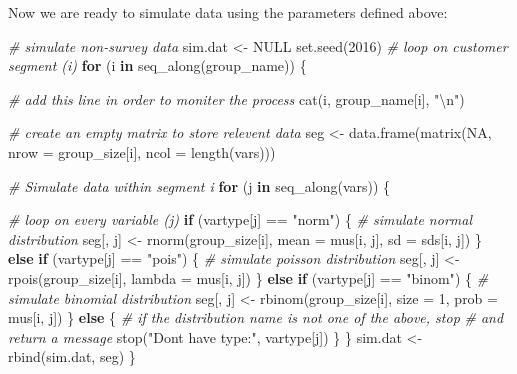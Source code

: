 \documentclass[
  12pt,
]{krantz}
\makeatletter
\newenvironment{Shaded}{\begin{snugshade}}{\end{snugshade}}
\newcommand{\AttributeTok}[1]{\textcolor[rgb]{0.61,0.61,0.61}{#1}}
\newcommand{\CommentTok}[1]{\textcolor[rgb]{0.37,0.37,0.37}{\textit{#1}}}
\newcommand{\ConstantTok}[1]{\textcolor[rgb]{0,0,0}{#1}}
\newcommand{\ControlFlowTok}[1]{\textcolor[rgb]{0.27,0.27,0.27}{\textbf{#1}}}
\newcommand{\DecValTok}[1]{\textcolor[rgb]{0.06,0.06,0.06}{#1}}
\newcommand{\FunctionTok}[1]{\textcolor[rgb]{0,0,0}{#1}}
\newcommand{\NormalTok}[1]{#1}
\newcommand{\OtherTok}[1]{\textcolor[rgb]{0.37,0.37,0.37}{#1}}
\newcommand{\SpecialCharTok}[1]{\textcolor[rgb]{0,0,0}{#1}}
\newcommand{\StringTok}[1]{\textcolor[rgb]{0.5,0.5,0.5}{#1}}
\newenvironment{kframe}{%
\medskip{}
\setlength{\fboxsep}{.8em}
 \def\at@end@of@kframe{}%
 \ifinner\ifhmode%
  \def\at@end@of@kframe{\end{minipage}}%
  \begin{minipage}{\columnwidth}%
 \fi\fi%
 \def\FrameCommand##1{\hskip\@totalleftmargin \hskip-\fboxsep
 \colorbox{shadecolor}{##1}\hskip-\fboxsep
     \hskip-\linewidth \hskip-\@totalleftmargin \hskip\columnwidth}%
 \MakeFramed {\advance\hsize-\width
   \@totalleftmargin\z@ \linewidth\hsize
   \@setminipage}}%
 {\par\unskip\endMakeFramed%
 \at@end@of@kframe}
\renewenvironment{Shaded}{\begin{kframe}}{\end{kframe}}
\makeatother
\begin{document}
Now we are ready to simulate data using the parameters defined above:

\begin{Shaded}
\begin{Highlighting}[]
\CommentTok{\# simulate non{-}survey data}
\NormalTok{sim.dat }\OtherTok{\textless{}{-}} \ConstantTok{NULL}
\FunctionTok{set.seed}\NormalTok{(}\DecValTok{2016}\NormalTok{)}
\CommentTok{\# loop on customer segment (i)}
\ControlFlowTok{for}\NormalTok{ (i }\ControlFlowTok{in} \FunctionTok{seq\_along}\NormalTok{(group\_name)) \{}
    
    \CommentTok{\# add this line in order to moniter the process}
    \FunctionTok{cat}\NormalTok{(i, group\_name[i], }\StringTok{"}\SpecialCharTok{\textbackslash{}n}\StringTok{"}\NormalTok{)}
    
    \CommentTok{\# create an empty matrix to store relevent data}
\NormalTok{    seg }\OtherTok{\textless{}{-}} \FunctionTok{data.frame}\NormalTok{(}\FunctionTok{matrix}\NormalTok{(}\ConstantTok{NA}\NormalTok{, }\AttributeTok{nrow =}\NormalTok{ group\_size[i], }
    \AttributeTok{ncol =} \FunctionTok{length}\NormalTok{(vars)))}
    
    \CommentTok{\# Simulate data within segment i}
    \ControlFlowTok{for}\NormalTok{ (j }\ControlFlowTok{in} \FunctionTok{seq\_along}\NormalTok{(vars)) \{}
        
        \CommentTok{\# loop on every variable (j)}
        \ControlFlowTok{if}\NormalTok{ (vartype[j] }\SpecialCharTok{==} \StringTok{"norm"}\NormalTok{) \{}
            \CommentTok{\# simulate normal distribution}
\NormalTok{            seg[, j] }\OtherTok{\textless{}{-}} \FunctionTok{rnorm}\NormalTok{(group\_size[i], }\AttributeTok{mean =}\NormalTok{ mus[i, }
\NormalTok{                j], }\AttributeTok{sd =}\NormalTok{ sds[i, j])}
\NormalTok{        \} }\ControlFlowTok{else} \ControlFlowTok{if}\NormalTok{ (vartype[j] }\SpecialCharTok{==} \StringTok{"pois"}\NormalTok{) \{}
            \CommentTok{\# simulate poisson distribution}
\NormalTok{            seg[, j] }\OtherTok{\textless{}{-}} \FunctionTok{rpois}\NormalTok{(group\_size[i], }\AttributeTok{lambda =}\NormalTok{ mus[i, }
\NormalTok{                j])}
\NormalTok{        \} }\ControlFlowTok{else} \ControlFlowTok{if}\NormalTok{ (vartype[j] }\SpecialCharTok{==} \StringTok{"binom"}\NormalTok{) \{}
            \CommentTok{\# simulate binomial distribution}
\NormalTok{            seg[, j] }\OtherTok{\textless{}{-}} \FunctionTok{rbinom}\NormalTok{(group\_size[i], }\AttributeTok{size =} \DecValTok{1}\NormalTok{, }
                \AttributeTok{prob =}\NormalTok{ mus[i, j])}
\NormalTok{        \} }\ControlFlowTok{else}\NormalTok{ \{}
            \CommentTok{\# if the distribution name is not one of the above, stop}
            \CommentTok{\# and return a message}
            \FunctionTok{stop}\NormalTok{(}\StringTok{"Don\textquotesingle{}t have type:"}\NormalTok{, vartype[j])}
\NormalTok{        \}}
\NormalTok{    \}}
\NormalTok{    sim.dat }\OtherTok{\textless{}{-}} \FunctionTok{rbind}\NormalTok{(sim.dat, seg)}
\NormalTok{\}}
\end{Highlighting}
\end{Shaded}
\end{document}
